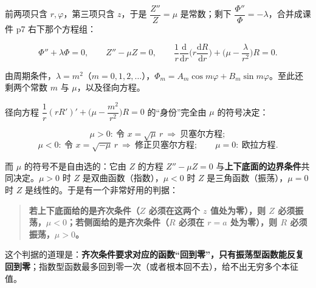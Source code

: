 \documentclass[11pt]{ctexart}
\let\origsubhdr\subhdr
\renewcommand{\subhdr}[1]{\par\needspace{3\baselineskip}\origsubhdr{#1}}
\begin{document}
前两项只含 $r,\varphi$，第三项只含 $z$，于是 $\dfrac{Z''}{Z}=\mu$ 是常数；剩下 $\dfrac{\Phi''}{\Phi}=-\lambda$，合并成课件 p7 右下那个方程组：

\begin{equation}
\Phi''+\lambda\Phi=0,
\qquad
Z''-\mu Z=0,
\qquad
\frac1r\frac{\mathrm d}{\mathrm dr}\Big(r\frac{\mathrm dR}{\mathrm dr}\Big)+\Big(\mu-\frac{\lambda}{r^2}\Big)R=0 .
\label{eq:cylsys}
\end{equation}

由周期条件，$\lambda=m^2$（$m=0,1,2,\dots$），$\Phi_m=A_m\cos m\varphi+B_m\sin m\varphi$。至此还剩两个常数 $m$ 与 $\mu$，以及径向方程。


径向方程 $\dfrac1r(rR')'+\Big(\mu-\dfrac{m^2}{r^2}\Big)R=0$ 的“身份”完全由 $\mu$ 的符号决定：

\[
\mu>0:\ \text{令 }x=\sqrt\mu\,r\ \Rightarrow\ \text{贝塞尔方程};
\]
\[
\mu<0:\ \text{令 }x=\sqrt{-\mu}\,r\ \Rightarrow\ \text{修正贝塞尔方程};
\qquad
\mu=0:\ \text{欧拉方程}.
\]

而 $\mu$ 的符号不是自由选的：它由 $Z$ 的方程 $Z''-\mu Z=0$ 与\textbf{上下底面的边界条件}共同决定。$\mu>0$ 时 $Z$ 是双曲函数（指数），$\mu<0$ 时 $Z$ 是三角函数（振荡），$\mu=0$ 时 $Z$ 是线性的。于是有一个非常好用的判据：

\begin{quote}
\textbf{若上下底面给的是齐次条件（$Z$ 必须在这两个 $z$ 值处为零），则 $Z$ 必须振荡，$\mu<0$；若侧面给的是齐次条件（$R$ 必须在 $r=a$ 处为零），则 $R$ 必须振荡，$\mu>0$。}
\end{quote}

这个判据的道理是：\textbf{齐次条件要求对应的函数“回到零”，只有振荡型函数能反复回到零}；指数型函数最多回到零一次（或者根本回不去），给不出无穷多个本征值。

\end{document}
